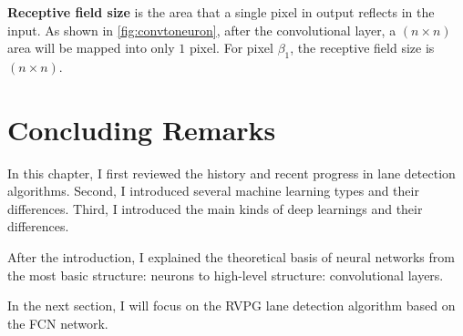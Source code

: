\begin{spacing}{1.5}
\textbf{Receptive field size} is the area that a single pixel in output reflects in the input. As shown in \autoref{fig:convtoneuron}, after the convolutional layer, a $(n \times n)$ area will be mapped into only $1$ pixel. For pixel $\beta_1$, the receptive field size is $(n \times n)$.

\section{Concluding Remarks}

In this chapter, I first reviewed the history and recent progress in lane detection algorithms. Second, I introduced several machine learning types and their differences. Third, I introduced the main kinds of deep learnings and their differences. 

After the introduction, I explained the theoretical basis of neural networks from the most basic structure: neurons to high-level structure: convolutional layers.

In the next section, I will focus on the RVPG lane detection algorithm based on the FCN network.

\end{spacing}
\newpage
